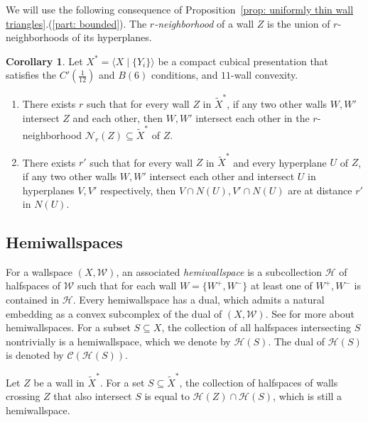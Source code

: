 \documentclass[12pt,oneside]{amsart}
\theoremstyle{definition}
\newtheorem{cor}[thm]{Corollary}
\theoremstyle{definition}
\theoremstyle{remark}
\newcommand{\C}{\mathcal{C}}
\newcommand{\Hem}{\mathcal{H}}
\newcommand{\neb}{\mathcal N}
\begin{document}
We will use the following consequence of Proposition~\ref{prop: uniformly thin wall triangles}.(\ref{part: bounded}). The \emph{$r$-neighborhood} of a wall $Z$ is the union of $r$-neighborhoods of its hyperplanes.
\begin{cor}\label{cor: existence of r}
    Let $X^*=\langle X \mid \{Y_i\} \rangle $ be a compact cubical presentation that satisfies the $C'(\frac{1}{12})$ and  $B(6)$ conditions, and $11$-wall convexity.
    \begin{enumerate}
        \item\label{case: Z case} There exists $r$ such that for every wall $Z$ in $\widetilde X^*$, if any two other walls $W,W'$ intersect $Z$ and each other, then $W,W'$ intersect each other in the $r$-neighborhood $\neb_r(Z)\subseteq \widetilde X^*$ of $Z$.
        \item\label{case: U case} There exists $r'$ such that for every wall $Z$ in $\widetilde X^*$ and every hyperplane $U$ of $Z$, if any two other walls $W,W'$ intersect each other and intersect $U$ in hyperplanes $V, V'$ respectively, then $V\cap N(U),V'\cap N(U)$ are at distance $r'$ in $N(U)$.
    \end{enumerate}
    
\end{cor}



\subsection{Hemiwallspaces}\label{subsec: hemi}

For a wallspace $(X, \mathcal{W})$, an associated \emph{hemiwallspace} is a subcollection $\Hem$ of halfspaces of $\mathcal{W}$ such that for each wall $W=\{W^+,W^-\}$ at least one of  $W^+,W^-$ is contained in $\Hem$. Every hemiwallspace has a dual, which admits a natural embedding as a convex subcomplex
of the dual of $(X, \mathcal{W})$.
 See \cite[Sec~3.4]{HruskaWiseAxioms} for more about hemiwallspaces.
For a subset $S\subseteq X$, the collection of all halfspaces intersecting $S$ nontrivially is a hemiwallspace, which we denote by $\Hem(S)$. The dual of $\Hem(S)$ is denoted by $\C(\Hem(S))$.



Let $Z$ be a wall in $\widetilde X^*$. 
 For a set $S\subseteq \widetilde X^*$, the collection of halfspaces of walls crossing $Z$ that also intersect $S$ is equal to $\Hem(Z)\cap \Hem(S)$, which is still a hemiwallspace.
\end{document}
